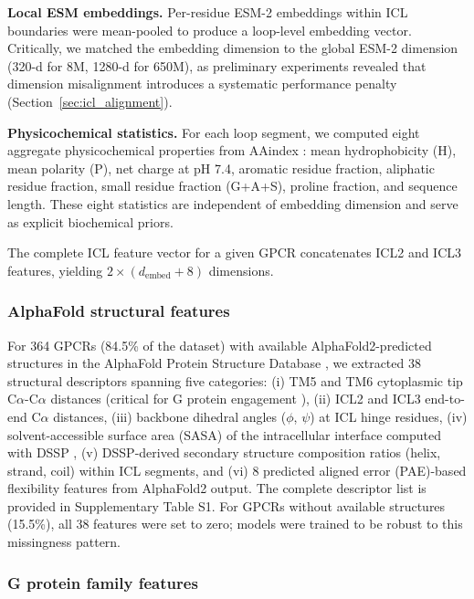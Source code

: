 \documentclass[11pt,a4paper]{article}
\begin{document}
\textbf{Local ESM embeddings.} Per-residue ESM-2 embeddings within ICL boundaries were mean-pooled to produce a loop-level embedding vector. Critically, we matched the embedding dimension to the global ESM-2 dimension (320-d for 8M, 1280-d for 650M), as preliminary experiments revealed that dimension misalignment introduces a systematic performance penalty (Section~\ref{sec:icl_alignment}).

\textbf{Physicochemical statistics.} For each loop segment, we computed eight aggregate physicochemical properties from AAindex \cite{kawashima2008aaindex}: mean hydrophobicity (H), mean polarity (P), net charge at pH 7.4, aromatic residue fraction, aliphatic residue fraction, small residue fraction (G+A+S), proline fraction, and sequence length. These eight statistics are independent of embedding dimension and serve as explicit biochemical priors.

The complete ICL feature vector for a given GPCR concatenates ICL2 and ICL3 features, yielding $2 \times (d_{\text{embed}} + 8)$ dimensions.

\subsubsection{AlphaFold structural features}

For 364 GPCRs (84.5\% of the dataset) with available AlphaFold2-predicted structures in the AlphaFold Protein Structure Database \cite{jumper2021highly, varadi2024alphafold}, we extracted 38 structural descriptors spanning five categories: (i) TM5 and TM6 cytoplasmic tip C$\alpha$-C$\alpha$ distances (critical for G protein engagement \cite{flock2023selectivity}), (ii) ICL2 and ICL3 end-to-end C$\alpha$ distances, (iii) backbone dihedral angles ($\phi$, $\psi$) at ICL hinge residues, (iv) solvent-accessible surface area (SASA) of the intracellular interface computed with DSSP \cite{kabsch1983dictionary}, (v) DSSP-derived secondary structure composition ratios (helix, strand, coil) within ICL segments, and (vi) 8 predicted aligned error (PAE)-based flexibility features from AlphaFold2 output. The complete descriptor list is provided in Supplementary Table S1. For GPCRs without available structures (15.5\%), all 38 features were set to zero; models were trained to be robust to this missingness pattern.

\subsubsection{G protein family features}
\end{document}
